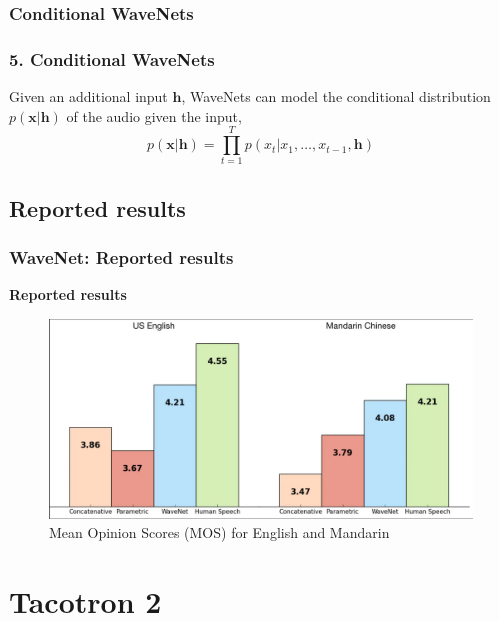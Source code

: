 \documentclass{beamer}
\begin{document}
  \subsubsection{Conditional WaveNets}
  \begin{frame}
    \frametitle{5. Conditional WaveNets}
    Given an additional input $\mathbf{h}$, WaveNets can model the conditional distribution $p(\mathbf{x}|\mathbf{h})$ of the audio given the input,
    \begin{equation*}
      p(\mathbf{x} | \mathbf{h}) = \prod_{t=1}^{T}p(x_t | x_1, \ldots, x_{t-1}, \mathbf{h}) 
    \end{equation*}
  \end{frame}

  \subsection{Reported results}
  \begin{frame}
    \frametitle{WaveNet: Reported results}
    \textbf{Reported results}
    \begin{figure}
      \includegraphics[width=\textwidth]{images/wavenet_mos.png}
      \caption{Mean Opinion Scores (MOS) for English and Mandarin}
    \end{figure}
  \end{frame}

  \section{Tacotron 2}
\end{document}
